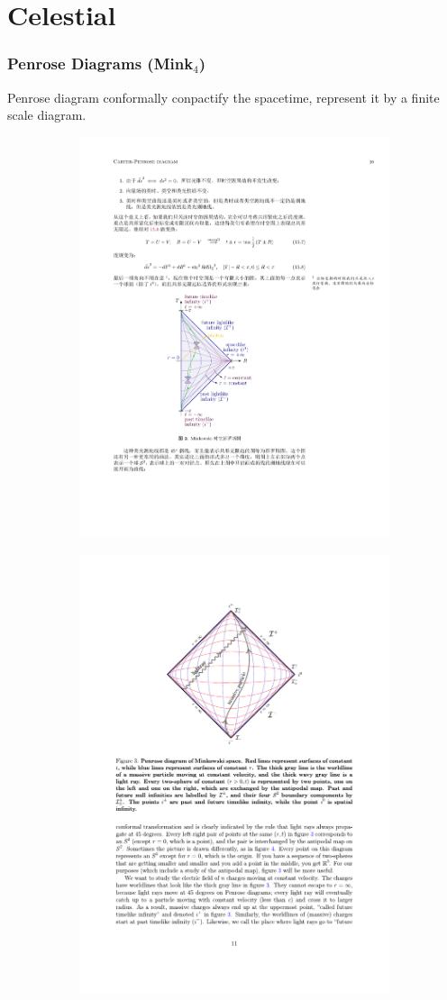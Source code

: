 \documentclass[aspectratio=169]{beamer}%
\begin{document}
	\section{Celestial}
	\begin{frame}
		\frametitle{Penrose Diagrams (Mink$_4$)}
		Penrose diagram conformally conpactify the spacetime, represent it by a finite scale diagram.
		\begin{figure}
			\centering
		\begin{subfigure}{.4\linewidth}
			\parbox[][6cm][c]{\linewidth}{%
				\centering
				\includegraphics[width=.6\linewidth]{./figs/2.pdf}}
		\end{subfigure}
		\begin{subfigure}{.4\linewidth}
			\parbox[][6cm][c]{\linewidth}{%
				\centering
				\includegraphics[width=.8\linewidth]{./figs/1.pdf}}
		\end{subfigure}
		\end{figure}
	\end{frame}
\end{document}
